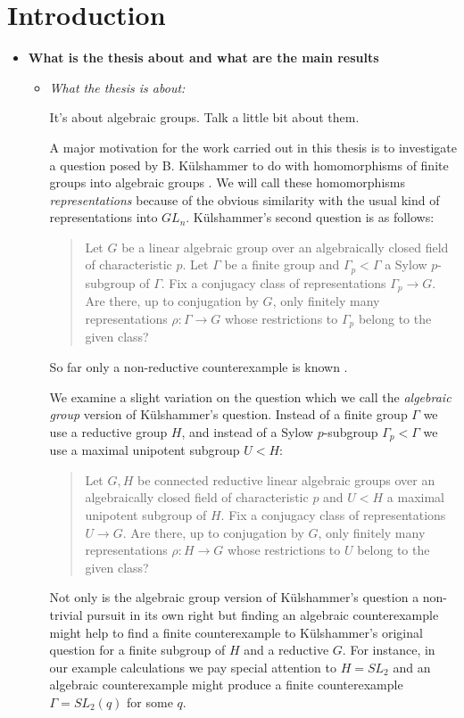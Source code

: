 
\chapter{Introduction}
\label{Chapter1}

\begin{itemize}
	\item[] \textbf{What is the thesis about and what are the main results}
	\begin{itemize}
		\item \emph{What the thesis is about:}
		
		
		It's about algebraic groups. Talk a little bit about them.
		
		A major motivation for the work carried out in this thesis is to investigate a question posed by B. K\"ulshammer to do with homomorphisms of finite groups into algebraic groups \cite{weil1964remarks}. We will call these homomorphisms \emph{representations} because of the obvious similarity with the usual kind of representations into $GL_n$. K\"ulshammer's second question is as follows:
		\begin{quote}
		Let $G$ be a linear algebraic group over an algebraically closed field of characteristic $p$. Let $\Gamma$ be a finite group and $\Gamma_p < \Gamma$ a Sylow $p$-subgroup of $\Gamma$. Fix a conjugacy class of representations $\Gamma_p\rightarrow G$. Are there, up to conjugation by $G$, only finitely many representations $\rho:\Gamma\rightarrow G$ whose restrictions to $\Gamma_p$ belong to the given class?
		\end{quote}
		
		
		So far only a non-reductive counterexample is known \cite{weil1964remarks}. 
		
		
		We examine a slight variation on the question which we call the \emph{algebraic group} version of K\"ulshammer's question. Instead of a finite group $\Gamma$ we use a reductive group $H$, and instead of a Sylow $p$-subgroup $\Gamma_p < \Gamma$ we use a maximal unipotent subgroup $U < H$:
		\begin{quote}
			Let $G,H$ be connected reductive linear algebraic groups over an algebraically closed field of characteristic $p$ and $U < H$ a maximal unipotent subgroup of $H$. Fix a conjugacy class of representations $U\rightarrow G$. Are there, up to conjugation by $G$, only finitely many representations $\rho:H\rightarrow G$ whose restrictions to $U$ belong to the given class?
		\end{quote}
		Not only is the algebraic group version of K\"ulshammer's question a non-trivial pursuit in its own right but finding an algebraic counterexample might help to find a finite counterexample to K\"ulshammer's original question for a finite subgroup of $H$ and a reductive $G$. For instance, in our example calculations we pay special attention to $H = SL_2$ and an algebraic counterexample might produce a finite counterexample $\Gamma = SL_2(q)$ for some $q$.
		

\end{itemize}
\end{itemize}
